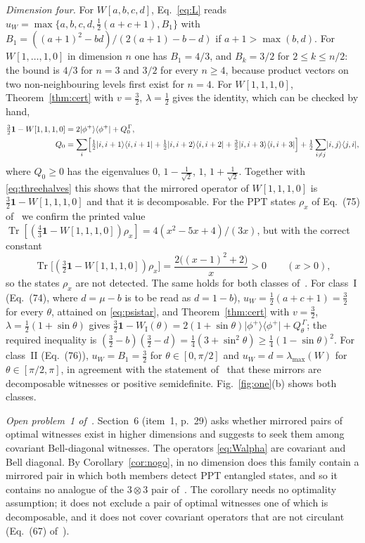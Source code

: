 \documentclass[10pt,a4paper]{article}
\newcommand{\ketbra}[2]{\lvert #1\rangle\langle #2\rvert}
\newcommand{\id}{\mathbf{1}}
\newcommand{\tr}{\operatorname{Tr}}
\newcommand{\G}{\Gamma}
\newcommand{\uW}{u_W}
\newcommand{\lmax}{\lambda_{\max}}
\begin{document}
\emph{Dimension four.} For $W[a,b,c,d]$, Eq.~\eqref{eq:L} reads
$\uW=\max\{a,b,c,d,\tfrac12(a+c+1),B_1\}$ with
$B_1=((a+1)^2-bd)/(2(a+1)-b-d)$ if $a+1>\max(b,d)$. For $W[1,\dots,1,0]$ in dimension
$n$ one has $B_1=4/3$, and $B_k=3/2$ for $2\le k\le n/2$: the bound is $4/3$ for $n=3$
and $3/2$ for every $n\ge4$, because product vectors on two non-neighbouring levels first
exist for $n=4$. For $W[1,1,1,0]$, Theorem~\ref{thm:cert} with $v=\tfrac32$,
$\lambda=\tfrac12$ gives the identity, which can be checked by hand,
\begin{equation}\label{eq:dec1110}
\begin{aligned}
\tfrac32\id-W[1,1,1,0]&=2\ketbra{\phi^+}{\phi^+}+Q_0^{\,\G},\\
Q_0&=\sum_i\Bigl[\tfrac12\ketbra{i,i+1}{i,i+1}+\tfrac12\ketbra{i,i+2}{i,i+2}
+\tfrac32\ketbra{i,i+3}{i,i+3}\Bigr]+\tfrac12\sum_{i\neq j}\ketbra{i,j}{j,i},
\end{aligned}
\end{equation}
where $Q_0\ge0$ has the eigenvalues $0$, $1-\tfrac1{\sqrt2}$, $1$, $1+\tfrac1{\sqrt2}$.
Together with \eqref{eq:threehalves} this shows that the mirrored operator of
$W[1,1,1,0]$ is $\tfrac32\id-W[1,1,1,0]$ and that it is decomposable. For the PPT states
$\rho_x$ of Eq.~(75) of~\cite{SBHCB26} we confirm the printed value
$\tr[(\tfrac43\id-W[1,1,1,0])\rho_x]=4(x^2-5x+4)/(3x)$, but with the correct constant
\begin{equation}\label{eq:rhox}
\tr\bigl[(\tfrac32\id-W[1,1,1,0])\rho_x\bigr]=\frac{2\bigl((x-1)^{2}+2\bigr)}{x}>0
\qquad(x>0),
\end{equation}
so the states $\rho_x$ are not detected. The same holds for both classes
of~\cite{SBHCB26}. For class~I (Eq.~(74), where $d=\mu-b$ is to be read as $d=1-b$),
$\uW=\tfrac12(a+c+1)=\tfrac32$ for every $\theta$, attained on \eqref{eq:psistar}, and
Theorem~\ref{thm:cert} with $v=\tfrac32$, $\lambda=\tfrac12(1+\sin\theta)$ gives
$\tfrac32\id-W_{\mathrm I}(\theta)=2(1+\sin\theta)\ketbra{\phi^+}{\phi^+}+Q_\theta^{\,\G}$;
the required inequality is
$(\tfrac32-b)(\tfrac32-d)=\tfrac14(3+\sin^2\theta)\ge\tfrac14(1-\sin\theta)^2$. For
class~II (Eq.~(76)), $\uW=B_1=\tfrac32$ for $\theta\in[0,\pi/2]$ and
$\uW=d=\lmax(W)$ for $\theta\in[\pi/2,\pi]$, in agreement with the statement
of~\cite{SBHCB26} that these mirrors are decomposable witnesses or positive semidefinite.
Fig.~\ref{fig:one}(b) shows both classes.

\emph{Open problem~1 of~\cite{SBHCB26}.} Section~6 (item~1, p.~29) asks whether mirrored
pairs of optimal witnesses exist in higher dimensions and suggests to seek them among
covariant Bell-diagonal witnesses. The operators \eqref{eq:Walpha} are covariant and Bell
diagonal. By Corollary~\ref{cor:nogo}, in no dimension does this family contain a mirrored
pair in which both members detect PPT entangled states, and so it contains no analogue of
the $3\otimes3$ pair of~\cite{CBBH25}. The corollary needs no optimality assumption; it
does not exclude a pair of optimal witnesses one of which is decomposable, and it does not
cover covariant operators that are not circulant (Eq.~(67) of~\cite{SBHCB26}).
\end{document}
